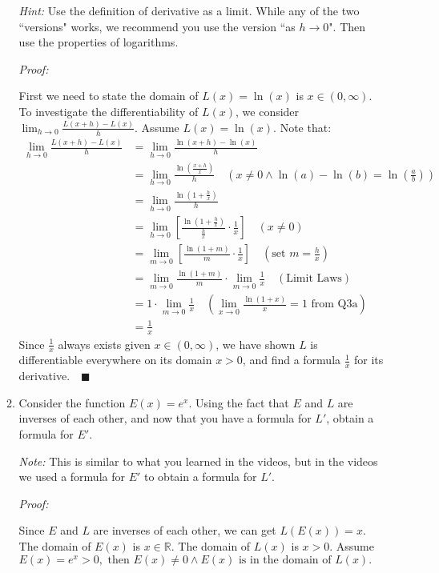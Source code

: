 \documentclass[12pt]{exam}
\newcommand {\DS} [1] {${\displaystyle #1}$}
\newcommand{\vv}{\vspace{.1cm}}
\newcommand{\R}{\mathbb{R}}
\begin{document}
\begin{enumerate}
\begin{enumerate}
			\emph{Hint:}  Use the definition of derivative as a limit.  While any of the two ``versions" works, we recommend you use the version ``as $h \to 0$".  Then use the properties of logarithms.
		\vv
		
		\emph{Proof:}
		
		\vv
		
		First we need to state the domain of $L(x)=\ln(x)$ is $x\in(0,\infty).$
		To investigate the differentiability of $L(x)$, we consider \DS{\lim_{h \to 0} \frac{L(x+h)-L(x)}{h}.} Assume $L(x)=\ln(x).$ Note that:
		\begin{align*}
		    \lim_{h \to 0} \frac{L(x+h)-L(x)}{h}&=\lim_{h \to 0} \frac{\ln(x+h)-\ln(x)}{h}\\
		    &=\lim_{h \to 0} \frac{\ln(\frac{x+h}{x})}{h}\quad(x\neq0 \land \ln(a)-\ln(b)=\ln(\frac{a}{b}))\\
		    &=\lim_{h \to 0} \frac{\ln(1+\frac{h}{x})}{h}\\
		    &=\lim_{h \to 0}[ \frac{\ln(1+\frac{h}{x})}{\frac{h}{x}}\cdot\frac{1}{x}]\quad(x\neq0)\\
		    &=\lim_{m \to 0}[ \frac{\ln(1+m)}{m}\cdot\frac{1}{x}]\quad(\mbox{set } m=\frac{h}{x})\\
		    &=\lim_{m \to 0} \frac{\ln(1+m)}{m}\cdot\lim_{m \to 0}\frac{1}{x}\quad(\mbox{Limit Laws})\\
		    &=1\cdot\lim_{m \to 0}\frac{1}{x}\quad(\lim_{x \to 0} \frac{\ln (1+x)}{x} = 1 \mbox{ from Q3a})\\
		    &=\frac{1}{x}
		\end{align*}
		Since $\frac{1}{x}$ always exists given $x\in(0,\infty)$, we have shown $L$ is differentiable everywhere on its domain $x>0$, and find a formula $\frac{1}{x}$ for its derivative.$\quad\blacksquare$
		
		\item  Consider the function \DS{E(x) = e^x}.  Using the fact that $E$ and $L$ are inverses of each other, and now that you have a formula for $L'$, obtain a formula for $E'$.
		
			\emph{Note:}  This is similar to what you learned in the videos, but in the videos we used a formula for $E'$ to obtain a formula for $L'$.
	    \vv
	    
	    \emph{Proof:}
	    
	    \vv
	    
	    Since $E$ and $L$ are inverses of each other, we can get $L(E(x))=x.$ The domain of $E(x)$ is $x\in\R.$ The domain of $L(x)$ is $x > 0.$ Assume $E(x)=e^x>0,\mbox{ then } E(x)\neq0 \land E(x)\mbox{ is in the domain of } L(x).$
	    

\end{enumerate}
\end{enumerate}
\end{document}

